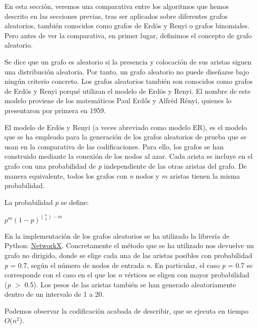 En esta sección, veremos una comparativa entre los algoritmos que hemos descrito en las secciones previas, tras ser aplicados sobre diferentes grafos aleatorios, también conocidos como grafos de Erdös y Renyi\cite{ErdosRenyi} o grafos binomiales. Pero antes de ver la comparativa, en primer lugar, definimos el concepto de grafo aleatorio.

Se dice que un grafo es aleatorio si la presencia y colocación de sus aristas siguen una distribución aleatoria. Por tanto, un grafo aleatorio no puede diseñarse bajo ningún criterio concreto. Los grafos aleatorios también son conocidos como grafos de Erdös y Renyi porqué utilizan el modelo de Erdös y Renyi. El nombre de este modelo proviene de los matemáticos Paul Erdős y Alfréd Rényi, quienes lo presentaron por primera en 1959.

El modelo de Erdös y Renyi (a veces abreviado como modelo ER), es el modelo que se ha empleado para la generación de los grafos aleatorios de prueba que se usan en la comparativa de las codificaciones. Para ello, los grafos se han construido mediante la conexión de los nodos al azar. Cada arista se incluye en el grafo con una probabilidad de \textit{p} independiente de las otras aristas del grafo. De manera equivalente, todos los grafos con \textit{n} nodos y \textit{m} aristas tienen la misma probabilidad. 

La probabilidad $p$ se define:

\begin{center}
	$p^m(1 - p)^{{n \choose 2} - m}$
\end{center}

En la implementación de los grafos aleatorios se ha utilizado la librería de Python:  \href{https://networkx.github.io/documentation/latest/reference/generated/networkx.generators.random\_graphs.erdos\_renyi\_graph.html?highlight=erdos\%20renyi#networkx.generators.random\_graphs.erdos\_renyi\_graph}{NetworkX}. Concretamente el método que se ha utilizado nos devuelve un grafo no dirigido, donde se elige cada una de las aristas posibles con probabilidad \textit{p} = 0.7, según el número de nodos de entrada \textit{n}. En particular, el caso \textit{p} = 0.7 se corresponde con el caso en el que los \textit{n} vértices se eligen con mayor probabilidad (\textit{p} $>$ 0.5). Los pesos de las aristas también se han generado aleatoriamente dentro de un intervalo de 1 a 20.

Podemos observar la codificación acabada de describir, que se ejecuta en tiempo $O$($n^2$).

